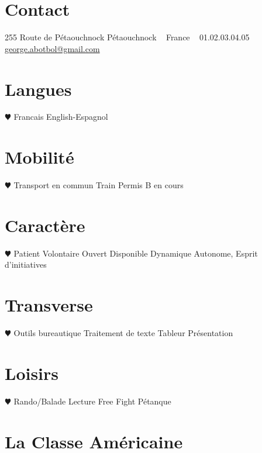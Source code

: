 \documentclass[]{cv-style}          %
\begin{document}


\begin{aside}
\section{Contact}
255 Route de Pétaouchnock
Pétaouchnock
~
France
~
01.02.03.04.05
~
 \href{mailto:george.abitbol@gmail.com}{george.abotbol@gmail.com}
~
~
\section{Langues}
{\color{blue} $\varheartsuit$}
Francais
English-Espagnol
~
%
\section{Mobilité}
{\color{red} $\varheartsuit$}
Transport en commun
Train
Permis B en cours
%
\section{Caractère}
{\color{blue} $\varheartsuit$}
Patient
Volontaire
Ouvert
Disponible
Dynamique
Autonome,
Esprit d'initiatives
%
\section{Transverse}
{\color{orange} $\varheartsuit$}
Outils bureautique
Traitement de texte
Tableur
Présentation
~
\section{Loisirs}
{\color{green} $\varheartsuit$}
Rando/Balade
Lecture
Free Fight
Pétanque
~
%
\end{aside}

\section{La  Classe Américaine}
\end{document}
